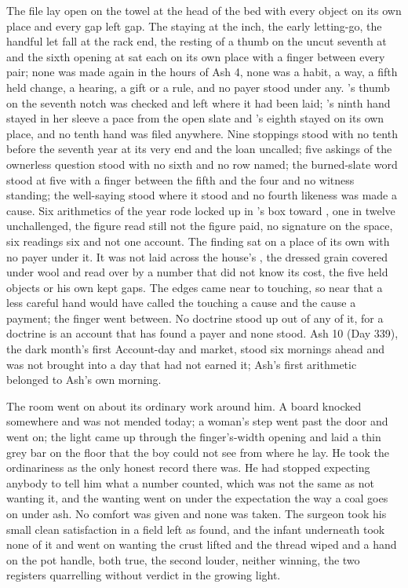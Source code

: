 The file lay open on the towel at the head of the bed with every object on its own place and every gap left gap. The staying at the inch, the early letting-go, the handful let fall at the rack end, the resting of a thumb on the uncut seventh at  and the sixth opening at  sat each on its own place with a finger between every pair; none was made again in the hours of Ash 4, none was a habit, a way, a fifth held change, a hearing, a gift or a rule, and no payer stood under any. 's thumb on the seventh notch was checked and left where it had been laid; 's ninth hand stayed in her sleeve a pace from the open slate and 's eighth stayed on its own place, and no tenth hand was filed anywhere. Nine stoppings stood with no tenth before the seventh year at its very end and the loan uncalled; five askings of the ownerless question stood with no sixth and no row named; the burned-slate word stood at five with a finger between the fifth and the four and no witness standing; the well-saying stood where it stood and no fourth likeness was made a cause. Six arithmetics of the year rode locked up  in 's box toward , one in twelve unchallenged, the figure read still not the figure paid, no signature on the space, six readings six and not one account. The finding sat on a place of its own with no payer under it. It was not laid across the house's , the dressed grain covered under wool and read over by a number that did not know its cost, the five held objects or his own kept gaps. The edges came near to touching, so near that a less careful hand would have called the touching a cause and the cause a payment; the finger went between. No doctrine stood up out of any of it, for a doctrine is an account that has found a payer and none stood. Ash 10 (Day 339), the dark month's first Account-day and market, stood six mornings ahead and was not brought into a day that had not earned it; Ash's first arithmetic belonged to Ash's own morning.

The room went on about its ordinary work around him. A board knocked somewhere and was not mended today; a woman's step went past the door and went on; the light came up through the finger's-width opening and laid a thin grey bar on the floor that the boy could not see from where he lay. He took the ordinariness as the only honest record there was. He had stopped expecting anybody to tell him what a number counted, which was not the same as not wanting it, and the wanting went on under the expectation the way a coal goes on under ash. No comfort was given and none was taken. The surgeon took his small clean satisfaction in a field left as found, and the infant underneath took none of it and went on wanting the crust lifted and the thread wiped and a hand on the pot handle, both true, the second louder, neither winning, the two registers quarrelling without verdict in the growing light.

